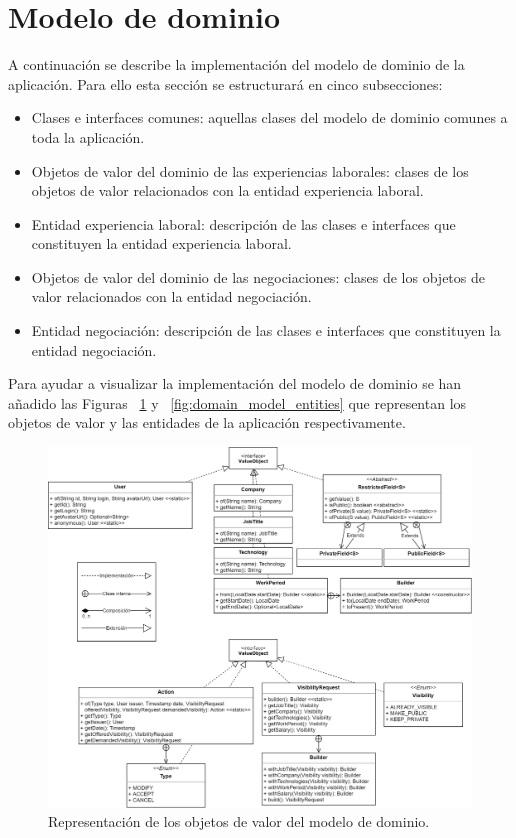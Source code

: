 \documentclass[a4paper, 12pt]{book}
\begin{document}
\section{Modelo de dominio} 
\label{sec:domain_model_impl}
A continuación se describe la implementación del modelo de dominio de la aplicación. Para ello esta sección se estructurará en cinco subsecciones:

	\begin{itemize}
	\item Clases e interfaces comunes: aquellas clases del modelo de dominio comunes a toda la aplicación.
	\item Objetos de valor del dominio de las experiencias laborales: clases de los objetos de valor relacionados con la entidad experiencia laboral.
	\item Entidad experiencia laboral: descripción de las clases e interfaces que constituyen la entidad experiencia laboral.
	\item Objetos de valor del dominio de las negociaciones: clases de los objetos de valor relacionados con la entidad negociación.
	\item Entidad negociación: descripción de las clases e interfaces que constituyen la entidad negociación.
	\end{itemize}

Para ayudar a visualizar la implementación del modelo de dominio se han añadido las Figuras ~\ref{fig:domain_model_vo} y ~\ref{fig:domain_model_entities} que representan los objetos de valor y las entidades de la aplicación respectivamente.

\begin{figure}
  \centering
  \includegraphics[width=15cm, keepaspectratio]{img/Modelo_dominio_vo.png}
  \caption{Representación de los objetos de valor del modelo de dominio.}\label{fig:domain_model_vo}
\end{figure}
\end{document}
